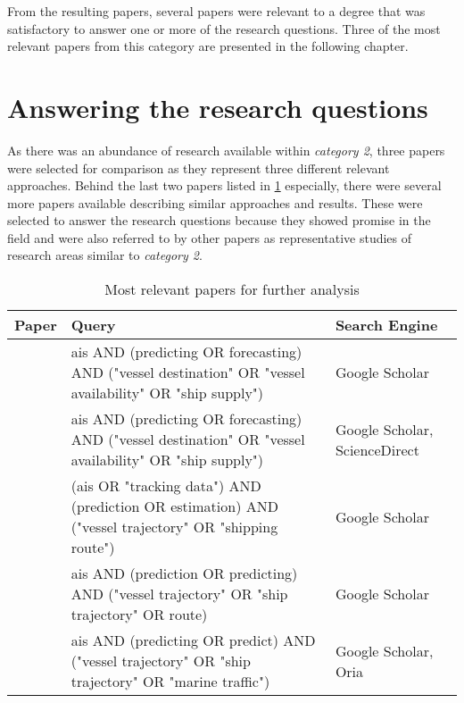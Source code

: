 From the resulting papers, several papers were relevant to a degree that was satisfactory to answer one or more of the research questions. Three of the most relevant papers from this category are presented in the following chapter.

\section{Answering the research questions}

As there was an abundance of research available within \textit{category 2}, three papers were selected for comparison as they represent three different relevant approaches. Behind the last two papers listed in \cref{tab:relevant_papers} especially, there were several more papers available describing similar approaches and results. These were selected to answer the research questions because they showed promise in the field and were also referred to by other papers as representative studies of research areas similar to \textit{category 2}.

\begin{table}
    \centering
    \begin{tabular}{|p{1.5in}|p{3in}|p{1.5in}|}
        \hline
        \textbf{Paper} & \textbf{Query} & \textbf{Search Engine} \\
        \hline
        \cite{lechtenberg2019} & ais AND (predicting OR forecasting) AND ("vessel destination" OR "vessel availability" OR "ship supply") & Google Scholar \\
        \hline
        \cite{ZHANG2020102729} & ais AND (predicting OR forecasting) AND ("vessel destination" OR "vessel availability" OR "ship supply") & Google Scholar, ScienceDirect \\
        \hline
        \cite{Pelizzari2016GeneticAF} & (ais OR "tracking data") AND (prediction OR estimation) AND ("vessel trajectory" OR "shipping route") & Google Scholar \\
        \hline
        \cite{pallotta} & ais AND (prediction OR predicting) AND ("vessel trajectory" OR "ship trajectory" OR route) & Google Scholar \\
        \hline
        \cite{Daranda2016NeuralNA} & ais AND (predicting OR predict) AND ("vessel trajectory" OR "ship trajectory" OR "marine traffic") & Google Scholar, Oria \\
        \hline
    \end{tabular}
    \caption{Most relevant papers for further analysis}
    \label{tab:relevant_papers}
\end{table}


